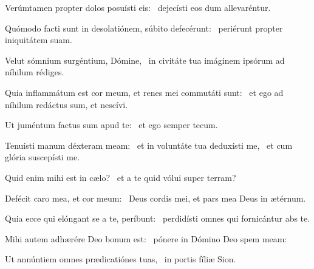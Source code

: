 \item Verúmtamen propter dolos posuísti eis:~\psstar{} dejecísti eos dum allevaréntur.

\item Quómodo facti sunt in desolatiónem, súbito defecérunt:~\psstar{} periérunt propter iniquitátem suam.

\item Velut sómnium surgéntium, Dómine,~\psstar{} in civitáte tua imáginem ipsórum ad níhilum rédiges.

\item Quia inflammátum est cor meum, et renes mei commutáti sunt:~\psstar{} et ego ad níhilum redáctus sum, et nescívi.

\item Ut juméntum factus sum apud te:~\psstar{} et ego semper tecum.

\item Tenuísti manum déxteram meam:~\pscross{} et in voluntáte tua deduxísti me,~\psstar{} et cum glória suscepísti me.

\item Quid enim mihi est in cælo?~\psstar{} et a te quid vólui super terram?

\item Defécit caro mea, et cor meum:~\psstar{} Deus cordis mei, et pars mea Deus in ætérnum.

\item Quia ecce qui elóngant se a te, períbunt:~\psstar{} perdidísti omnes qui fornicántur abs te.

\item Mihi autem adhærére Deo bonum est:~\psstar{} pónere in Dómino Deo spem meam:

\item Ut annúntiem omnes prædicatiónes tuas,~\psstar{} in portis fíliæ Sion.

